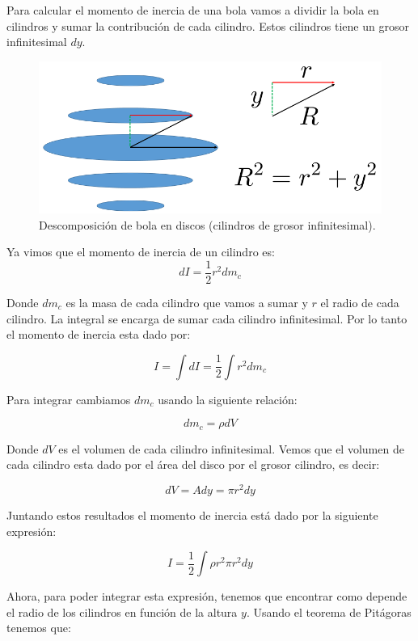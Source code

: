 \documentclass[a4paper,11pt]{article}
\begin{document}
\vspace{0.5cm}

Para calcular el momento de inercia de una bola vamos a dividir la bola en cilindros y sumar la contribución de cada cilindro. Estos cilindros tiene un grosor infinitesimal $dy$. 

\vspace{0.5cm}

\begin{figure}[H]
	\includegraphics[width=1\linewidth]{./im/bola}
	\caption{Descomposición de bola en discos (cilindros de grosor infinitesimal).}
\end{figure}
\vspace{0.5cm}
Ya vimos que el momento de inercia de un cilindro es:
$$ dI = \frac{1}{2} r^2 dm_c $$

Donde $dm_c$ es la masa de cada cilindro que vamos a sumar y $r$ el radio de cada cilindro. La integral se encarga de sumar cada cilindro infinitesimal. Por lo tanto el momento de inercia esta dado por:

$$ I = \int d I  = \frac{1}{2}\int r^2 dm_c $$

Para integrar cambiamos $dm_c$ usando la siguiente relación:

$$ dm_c = \rho dV$$

Donde $dV$ es el volumen de cada cilindro infinitesimal. Vemos que el volumen de cada cilindro esta dado por el área del disco por el grosor cilindro, es decir:

$$ dV = A dy = \pi r^2 d y$$

Juntando estos resultados el momento de inercia está dado por la siguiente expresión:
 
$$ I = \frac{1}{2} \int \rho r^2 \pi r^2 dy$$

Ahora, para poder integrar esta expresión, tenemos que encontrar como depende el radio de los cilindros en función de la altura $y$. Usando el teorema de Pitágoras tenemos que:
\end{document}
